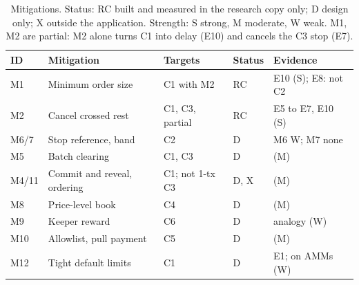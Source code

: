 \begin{table}[t]
\caption{Mitigations. Status: RC built and measured in the research copy only; D design only; X outside the application. Strength: S strong, M moderate, W weak. M1, M2 are partial: M2 alone turns C1 into delay (E10) and cancels the C3 stop (E7).}
\label{tab:mitigations}
\centering
\scriptsize
\setlength{\tabcolsep}{2.3pt}
\begin{tabular}{@{}lllll@{}}
\toprule
ID & Mitigation & Targets & Status & Evidence \\
\midrule
M1 & Minimum order size & C1 with M2 & RC & E10 (S); E8: not C2 \\ %
M2 & Cancel crossed rest & C1, C3, partial & RC & E5 to E7, E10 (S) \\ %
M6/7 & Stop reference, band & C2 & D & M6 W; M7 none \\ %
M5 & Batch clearing & C1, C3 & D & \cite{src11budish2015,src09moosavi2023} (M) \\ %
M4/11 & Commit and reveal, ordering & C1; not 1-tx C3 & D, X & \cite{src20canidio2024,src18heimbach2022,src29choudhuri2024} (M) \\ %
M8 & Price-level book & C4 & D & \cite{src09moosavi2023} (M) \\ %
M9 & Keeper reward & C6 & D & \cite{src01daian2020} analogy (W) \\ %
M10 & Allowlist, pull payment & C5 & D & \cite{src15grech2018,src06zhou2023} (M) \\ %
M12 & Tight default limits & C1 & D & E1; \cite{src34chemaya2025} on AMMs (W) \\ %
\bottomrule
\end{tabular}
\end{table}
